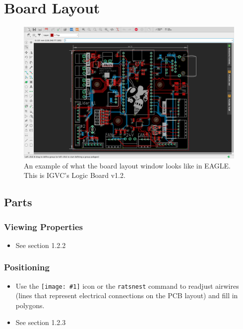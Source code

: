 \documentclass{article}
\newcommand{\icon}[1]{\texttt{[image: \#1]}}
\begin{document}
\pagebreak

\section{Board Layout}
\begin{figure}[ht]
	\center
	\includegraphics[width=\textwidth, keepaspectratio]{boardlayout.png}
	\caption{An example of what the board layout window looks like in EAGLE. This is IGVC's Logic Board v1.2.}
	\label{fig:board layout window}
\end{figure}


\subsection{Parts}
\subsubsection{Viewing Properties}
\begin{itemize}
    \item See section 1.2.2
\end{itemize}

\subsubsection{Positioning}
\begin{itemize}
    \item Use the \icon{ratsnest.png} icon or the \texttt{ratsnest} command to readjust airwires (lines that represent electrical connections on the PCB layout) and fill in polygons.
    \item See section 1.2.3 
\end{itemize}
\end{document}
